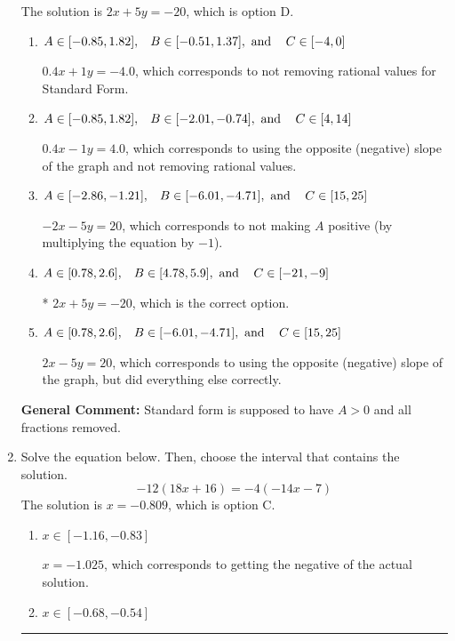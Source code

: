 \documentclass{extbook}[14pt]
\newcommand{\litem}[1]{\item #1

\rule{\textwidth}{0.4pt}}
\begin{document}
\begin{enumerate}
{The solution is \( 2x + 5y = -20 \), which is option D.\begin{enumerate}[label=\Alph*.]
\item \( A \in [-0.85, 1.82], \hspace{3mm} B \in [-0.51, 1.37], \text{ and } \hspace{3mm} C \in [-4, 0] \)

 $0.4x + 1y = -4.0$, which corresponds to not removing rational values for Standard Form.
\item \( A \in [-0.85, 1.82], \hspace{3mm} B \in [-2.01, -0.74], \text{ and } \hspace{3mm} C \in [4, 14] \)

 $0.4x - 1y = 4.0$, which corresponds to using the opposite (negative) slope of the graph and not removing rational values.
\item \( A \in [-2.86, -1.21], \hspace{3mm} B \in [-6.01, -4.71], \text{ and } \hspace{3mm} C \in [15, 25] \)

 $-2x - 5y = 20$, which corresponds to not making $A$ positive (by multiplying the equation by $-1$).
\item \( A \in [0.78, 2.6], \hspace{3mm} B \in [4.78, 5.9], \text{ and } \hspace{3mm} C \in [-21, -9] \)

* $2x + 5y = -20$, which is the correct option.
\item \( A \in [0.78, 2.6], \hspace{3mm} B \in [-6.01, -4.71], \text{ and } \hspace{3mm} C \in [15, 25] \)

 $2x - 5y = 20$, which corresponds to using the opposite (negative) slope of the graph, but did everything else correctly.
\end{enumerate}

\textbf{General Comment:} Standard form is supposed to have $A > 0$ and all fractions removed.
}
\litem{
Solve the equation below. Then, choose the interval that contains the solution.
\[ -12(18x + 16) = -4(-14x -7) \]The solution is \( x = -0.809 \), which is option C.\begin{enumerate}[label=\Alph*.]
\item \( x \in [-1.16, -0.83] \)

$x = -1.025$, which corresponds to getting the negative of the actual solution.
\item \( x \in [-0.68, -0.54] \)


\end{enumerate}}
\end{enumerate}
\end{document}
